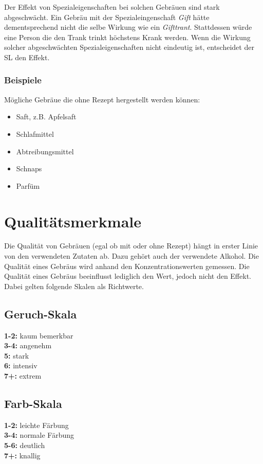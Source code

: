 Der Effekt von Spezialeigenschaften bei solchen Gebräuen sind stark abgeschwächt. Ein Gebräu mit der Spezialeingenschaft \textit{Gift} hätte dementsprechend nicht die selbe Wirkung wie ein \textit{Gifttrant}. Stattdessen würde eine Person die den Trank trinkt höchstens Krank werden. Wenn die Wirkung solcher abgeschwächten Spezialeigenschaften nicht eindeutig ist, entscheidet der SL den Effekt.

\subsubsection{Beispiele}
Mögliche Gebräue die ohne Rezept hergestellt werden können: 
\begin{itemize}
	\item Saft, z.B. Apfelsaft
	\item Schlafmittel
	\item Abtreibungsmittel
	\item Schnaps
	\item Parfüm
\end{itemize}


\section{Qualitätsmerkmale}
Die Qualität von Gebräuen (egal ob mit oder ohne Rezept) hängt in erster Linie von den verwendeten Zutaten ab. Dazu gehört auch der verwendete Alkohol. Die Qualität eines Gebräus wird anhand den Konzentrationswerten gemessen. Die Qualität eines Gebräus beeinflusst lediglich den Wert, jedoch nicht den Effekt. Dabei gelten folgende Skalen als Richtwerte. 

\subsection{Geruch-Skala}
\textbf{1-2:} kaum bemerkbar \\
\textbf{3-4:} angenehm \\
\textbf{5:} stark \\
\textbf{6:} intensiv \\
\textbf{7+:} extrem 

\subsection{Farb-Skala}
\textbf{1-2:} leichte Färbung \\
\textbf{3-4:} normale Färbung \\
\textbf{5-6:} deutlich \\
\textbf{7+:} knallig

